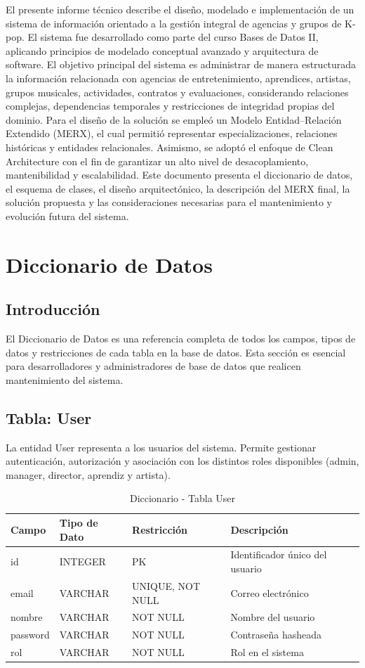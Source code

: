 \documentclass[12pt,a4paper,spanish,oneside]{report}
\begin{document}
El presente informe técnico describe el diseño, modelado e implementación de un
sistema de información orientado a la gestión integral de agencias y grupos de K-pop. El
sistema fue desarrollado como parte del curso Bases de Datos II, aplicando principios de
modelado conceptual avanzado y arquitectura de software.
El objetivo principal del sistema es administrar de manera estructurada la información relacionada con agencias de entretenimiento, aprendices, artistas, grupos musicales,
actividades, contratos y evaluaciones, considerando relaciones complejas,
dependencias temporales y restricciones de integridad propias del dominio.
Para el diseño de la solución se empleó un Modelo Entidad–Relación Extendido (MERX),
el cual permitió representar especializaciones, relaciones históricas y entidades relacionales. Asimismo, se adoptó el enfoque de Clean Architecture con el fin de garantizar un alto
nivel de desacoplamiento, mantenibilidad y escalabilidad.
Este documento presenta el diccionario de datos, el esquema de clases, el diseño arquitectónico, la descripción del MERX final, la solución propuesta y las consideraciones
necesarias para el mantenimiento y evolución futura del sistema.

\chapter{Diccionario de Datos}

\section{Introducción}

El Diccionario de Datos es una referencia completa de todos los campos, tipos de datos y restricciones de cada tabla en la base de datos. Esta sección es esencial para desarrolladores y administradores de base de datos que realicen mantenimiento del sistema.

\section{Tabla: User}
La entidad User representa a los usuarios del sistema. Permite gestionar autenticación,
autorización y asociación con los distintos roles disponibles (admin, manager, director, aprendiz
y artista).
\begin{table}[H]
\centering
\caption{Diccionario - Tabla User}
\begin{tabular}{|l|l|l|l|l|}
\hline
\textbf{Campo} & \textbf{Tipo de Dato} & \textbf{Restricción} & \textbf{Descripción} \\
\hline
id & INTEGER & PK & Identificador único del usuario \\
\hline
email & VARCHAR & UNIQUE, NOT NULL & Correo electrónico \\
\hline
nombre & VARCHAR & NOT NULL & Nombre del usuario \\
\hline
password & VARCHAR & NOT NULL & Contraseña hasheada \\
\hline
rol & VARCHAR & NOT NULL & Rol en el sistema \\
\hline
\end{tabular}
\end{table}
\end{document}
